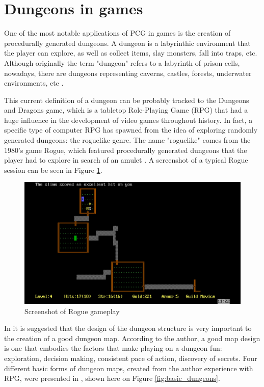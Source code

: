 \section{Dungeons in games}

One of the most notable applications of PCG in games is the creation of procedurally generated dungeons. A dungeon is a labyrinthic environment that the player can explore, as well as collect items, slay monsters, fall into traps, etc. Although originally the term "dungeon" refers to a labyrinth of prison cells, nowadays, there are dungeons representing caverns, castles, forests, underwater environments, etc \cite{shaker:2016}. 

This current definition of a dungeon can be probably tracked to the Dungeons and Dragons game, which is a tabletop Role-Playing Game (RPG) that had a huge influence in the development of video games throughout history. In fact, a specific type of computer RPG has spawned from the idea of exploring randomly generated dungeons: the roguelike genre. The name "roguelike" comes from the 1980's game Rogue, which featured procedurally generated dungeons that the player had to explore in search of an amulet \cite{brewer:2016}. A screenshot of a typical Rogue session can be seen in Figure \ref{fig:rogue}.

\begin{figure}[h]
    \caption{Screenshot of Rogue gameplay}
    \centerline{\includegraphics[width=13cm]{images/introduction/rogue.jpg}}
    \label{fig:rogue}
\end{figure}

In \textcite{melan:2006} it is suggested that the design of the dungeon structure is very important to the creation of a good dungeon map. According to the author, a good map design is one that embodies the factors that make playing on a dungeon fun: exploration, decision making, consistent pace of action, discovery of secrets. Four different basic forms of dungeon maps, created from the author experience with RPG, were presented in \textcite{melan:2006},  shown here on Figure \ref{fig:basic_dungeons}. 

